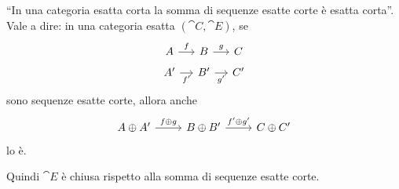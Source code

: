 \begin{proposition}\label{proposition:SumExactSeqsIsExact}
  ``In una categoria esatta corta la somma di sequenze esatte corte è
  esatta corta''. Vale a dire: in una categoria esatta
  \((\cat C,\cat E)\), se
  \[
    \begin{tikzcd}[row sep=tiny, column sep=small]
      A \ar["{f}", r] & B \ar["{g}", r] & C \\
      A' \ar["{f'}", r, swap] & B' \ar["{g'}", r, swap] & C'
    \end{tikzcd}
  \]
  sono sequenze esatte corte, allora anche
  \begin{equation}
    \label{cd:SumExactSeqs}
    \begin{tikzcd}[row sep=small]
      A \oplus A' \ar["{f \oplus g}", r] & B \oplus B' \ar["{f' \oplus
        g'}", r] & C \oplus C'
    \end{tikzcd}
  \end{equation}
  lo è.
\end{proposition}

Quindi \(\cat E\) è chiusa rispetto alla somma di sequenze esatte corte.

